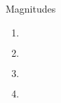\documentclass{alex_hü}
\begin{document}
\renewcommand{\labelenumi}{\alph{enumi})}


\begin{mybox}{Magnitudes}
	\centering \(  \)
	\tcblower
	\begin{enumerate}
		\item \(  \)
%			
	\tcbline
		\item \(  \)
%		
	\tcbline
		\item \(  \)
%			
	\tcbline
		\item \(  \)
%			
	\end{enumerate}
\end{mybox}
\end{document}
